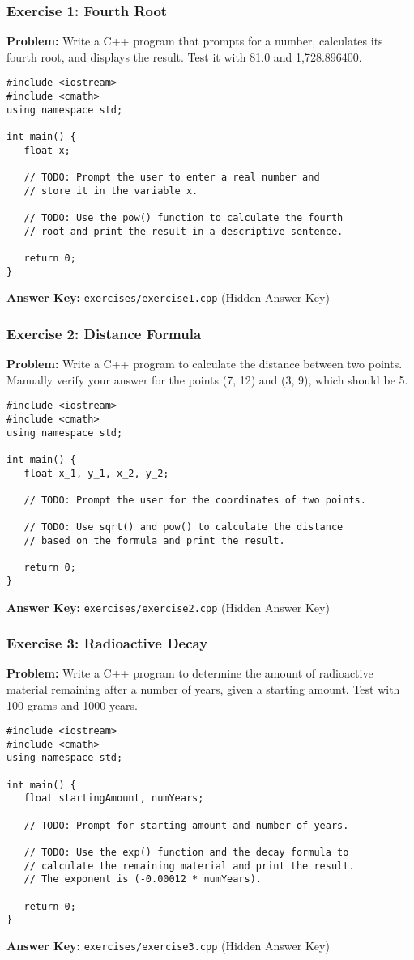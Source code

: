 \documentclass{beamer}
\begin{document}
\begin{frame}[fragile]
\frametitle{Exercise 1: Fourth Root}
\textbf{Problem:} Write a C++ program that prompts for a number, calculates its fourth root, and displays the result. Test it with 81.0 and 1,728.896400.

\begin{verbatim}
#include <iostream>
#include <cmath>
using namespace std;

int main() {
   float x;

   // TODO: Prompt the user to enter a real number and
   // store it in the variable x.

   // TODO: Use the pow() function to calculate the fourth
   // root and print the result in a descriptive sentence.

   return 0;
}
\end{verbatim}
\vfill
\textbf{Answer Key:} \texttt{exercises/exercise1.cpp} (Hidden Answer Key)
\end{frame}

\begin{frame}[fragile]
\frametitle{Exercise 2: Distance Formula}
\textbf{Problem:} Write a C++ program to calculate the distance between two points. Manually verify your answer for the points (7, 12) and (3, 9), which should be 5.
\begin{verbatim}
#include <iostream>
#include <cmath>
using namespace std;

int main() {
   float x_1, y_1, x_2, y_2;

   // TODO: Prompt the user for the coordinates of two points.

   // TODO: Use sqrt() and pow() to calculate the distance
   // based on the formula and print the result.

   return 0;
}
\end{verbatim}
\vfill
\textbf{Answer Key:} \texttt{exercises/exercise2.cpp} (Hidden Answer Key)
\end{frame}

\begin{frame}[fragile]
\frametitle{Exercise 3: Radioactive Decay}
\textbf{Problem:} Write a C++ program to determine the amount of radioactive material remaining after a number of years, given a starting amount. Test with 100 grams and 1000 years.
\begin{verbatim}
#include <iostream>
#include <cmath>
using namespace std;

int main() {
   float startingAmount, numYears;

   // TODO: Prompt for starting amount and number of years.

   // TODO: Use the exp() function and the decay formula to
   // calculate the remaining material and print the result.
   // The exponent is (-0.00012 * numYears).

   return 0;
}
\end{verbatim}
\vfill
\textbf{Answer Key:} \texttt{exercises/exercise3.cpp} (Hidden Answer Key)
\end{frame}
\end{document}
